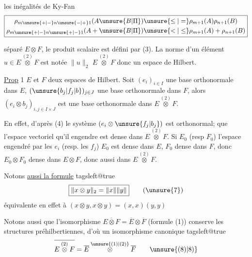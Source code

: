   les inégalités de Ky-Fan
\[
\boxed{\begin{aligned}
\rho_{m\unsure{+|-}n\unsure{-|+}1}(A\unsure{B|\Pi})&\unsure{\leq|=}\rho_{m+1}(A)\rho_{n+1}(B)\\
\rho_{m\unsure{+|-}n\unsure{+|-}1}(A+\unsure{B|\Pi})&\unsure{<|\leq}\rho_{m+1}(A)+\rho_{n+1}(B)
\end{aligned}}
\]


séparé $E\otimes F$,  le produit scalaire est défini par (3). La norme d'un élément  $u\in E\overset{(2)}{\otimes}F$ est notée $\lVert u\rVert_2$ $E\overset{(2)}{\otimes}F$ donc un espace de Hilbert.

\uline{Prop} 1  $E$ et $F$ deux espaces de Hilbert.  Soit $(e_i)_{i\in I}$ une base orthonormale dans $E$, $(\unsure{b_j|f_j|b})_{j\in J}$ une base orthonormale dans $F$, alors $(e_i\otimes b_j)_{i,j\in I\times J}$ est une base orthonormale dans $E\overset{(2)}{\otimes}F$.

En effet, d'après (4) le système $(e_i\otimes \unsure{f_j|b_j})$ est orthonormal;       que l'espace vectoriel qu'il engendre est dense dans $E\overset{(2)}{\otimes}F$.  Si $E_0$ (resp $F_0$)  l'espace engendré par les $e_i$ (resp. les $f_j$)    $E_0$ est dense dans $E$, $F_0$ dense dans $F$, donc $E_0\otimes F_0$ dense dans $E\otimes F$, donc aussi dans $E\overset{(2)}{\otimes}F$.

Notons \uline{aussi la formule}
\begingroup
\csname tagsleft@true\endcsname
\[
\boxed{\lVert x\otimes y\rVert_2=\lVert x\rVert\lVert y\rVert}
\tag*{(\unsure{7})}
\]
\endgroup
équivalente en effet à   $(x\otimes y,x\otimes y)=(x,x)(y,y)$ 

Notons aussi que l'isomorphisme  $\overline{E\otimes F}=\overline{E}\otimes\overline{F}$ (formule (1)) conserve  les structures préhilbertiennes, d'où un isomorphisme canonique
\begingroup
\csname tagsleft@true\endcsname
\[
\overline{E\overset{(2)}{\otimes}F}=\overline E\overset{\unsure{(1)|(2)}}{\otimes}\overline F
\tag*{\unsure{(8)|8)}}
\]
\endgroup

